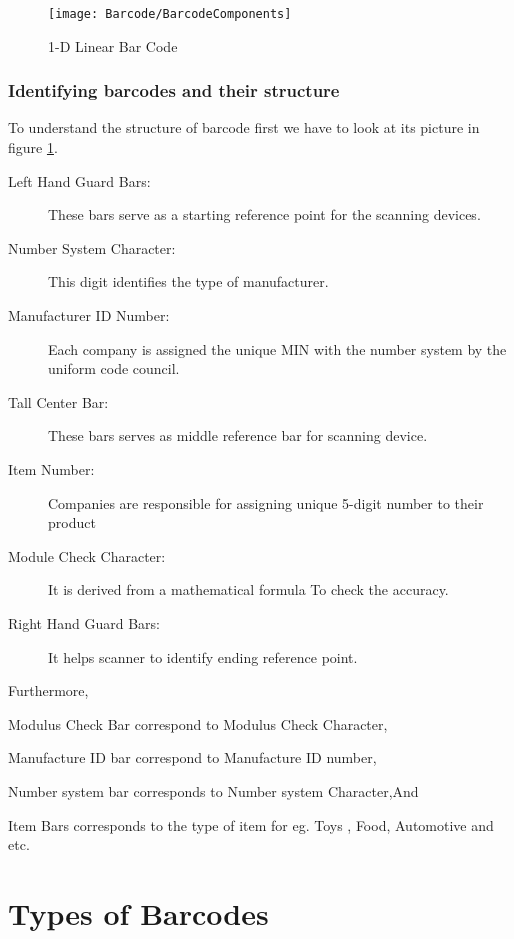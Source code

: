 \begin{figure}
  \begin{center}
	\texttt{[image: Barcode/BarcodeComponents]}
	\caption{1-D Linear Bar Code}\label{fig:LinearBarCode}
  \end{center}
\end{figure}

\subsubsection{Identifying barcodes and their structure}

To understand the structure of barcode first we have to look at its picture in figure \ref{fig:LinearBarCode}.

\begin{description}
  \item [Left Hand Guard Bars:] These bars serve as a starting reference point for the scanning devices.
  \item[Number System Character:] This digit identifies the type of manufacturer.
  \item[Manufacturer ID Number:] Each company is assigned the unique MIN with the number system by the uniform code council.
  \item[Tall Center Bar:] These bars serves as middle reference bar for scanning device.
  \item[Item Number:] Companies are responsible for assigning unique 5-digit number to their product
  \item[Module Check Character:] It is derived from a mathematical formula To check the accuracy.
  \item[Right Hand Guard Bars:] It helps scanner to identify ending  reference point.
\end{description}

Furthermore, 

Modulus Check Bar correspond to Modulus Check Character, 

Manufacture ID bar correspond to Manufacture ID number,

Number system bar corresponds to Number system Character,And 

Item Bars corresponds to the type of item for eg. Toys , Food, Automotive and etc. 

\section{Types of Barcodes}

